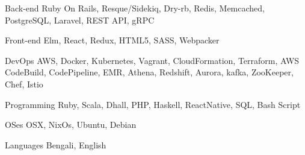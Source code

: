 

\begin{cvskills}

  \cvskill
    {Back-end} %
    {Ruby On Rails, Resque/Sidekiq, Dry-rb, Redis, Memcached, PostgreSQL, Laravel, REST API, gRPC} %

  \cvskill
    {Front-end} %
    {Elm, React, Redux, HTML5, SASS, Webpacker} %

  \cvskill
    {DevOps} %
    {AWS, Docker, Kubernetes, Vagrant, CloudFormation, Terraform, AWS CodeBuild, CodePipeline, EMR, Athena, Redshift, Aurora, kafka, ZooKeeper, Chef, Istio} %

  \cvskill
    {Programming} %
    {Ruby, Scala, Dhall, PHP, Haskell, ReactNative, SQL, Bash Script} %

  \cvskill
    {OSes} %
    {OSX, NixOs, Ubuntu, Debian} %

  \cvskill
    {Languages} %
    {Bengali, English} %

\end{cvskills}

